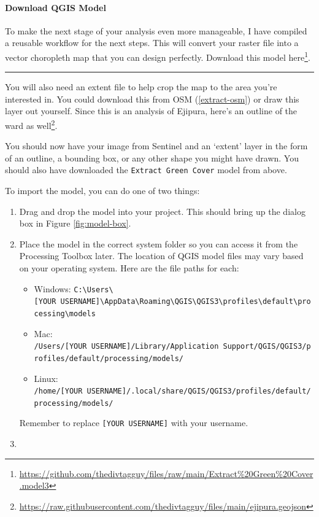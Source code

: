 \documentclass[
]{latex/krantz}
\providecommand{\tightlist}{%
  \setlength{\itemsep}{0pt}\setlength{\parskip}{0pt}}
\renewcommand{\href}[2]{#2\footnote{\url{#1}}}
\DeclareRobustCommand{\href}[2]{#2\footnote{\url{#1}}}
\begin{document}
\hypertarget{download-qgis-model}{%
\paragraph*{Download QGIS Model}\label{download-qgis-model}}

To make the next stage of your analysis even more manageable, I have compiled a reusable workflow for the next steps. This will convert your raster file into a vector choropleth map that you can design perfectly. Download this model \href{https://github.com/thedivtagguy/files/raw/main/Extract\%20Green\%20Cover.model3}{here}.

\begin{center}\rule{0.5\linewidth}{0.5pt}\end{center}

You will also need an extent file to help crop the map to the area you're interested in. You could download this from OSM (\ref{extract-osm}) or draw this layer out yourself. Since this is an analysis of Ejipura, \href{https://raw.githubusercontent.com/thedivtagguy/files/main/ejipura.geojson}{here's an outline of the ward as well}.

You should now have your image from Sentinel and an `extent' layer in the form of an outline, a bounding box, or any other shape you might have drawn. You should also have downloaded the \texttt{Extract\ Green\ Cover} model from above.

To import the model, you can do one of two things:

\begin{enumerate}
\def\labelenumi{\arabic{enumi}.}
\item
  Drag and drop the model into your project. This should bring up the dialog box in Figure \ref{fig:model-box}.
\item
  Place the model in the correct system folder so you can access it from the Processing Toolbox later. The location of QGIS model files may vary based on your operating system. Here are the file paths for each:

  \begin{itemize}
  \tightlist
  \item
    Windows: \texttt{C:\textbackslash{}Users\textbackslash{}{[}YOUR\ USERNAME{]}\textbackslash{}AppData\textbackslash{}Roaming\textbackslash{}QGIS\textbackslash{}QGIS3\textbackslash{}profiles\textbackslash{}default\textbackslash{}processing\textbackslash{}models}
  \item
    Mac: \texttt{/Users/{[}YOUR\ USERNAME{]}/Library/Application\ Support/QGIS/QGIS3/profiles/default/processing/models/}
  \item
    Linux: \texttt{/home/{[}YOUR\ USERNAME{]}/.local/share/QGIS/QGIS3/profiles/default/processing/models/}
  \end{itemize}

  Remember to replace \texttt{{[}YOUR\ USERNAME{]}} with your username.
\item
  \textcite{adhvaryuMappingPublicTransport2019}
\end{enumerate}
\end{document}
